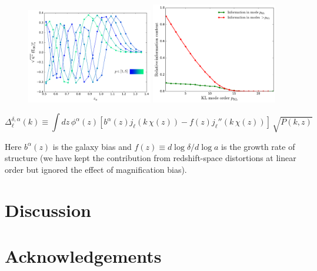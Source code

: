 \documentclass[twocolumn,amsfont,amssymb,amsmath, showpacs,balancelastpage, nofootinbib]{revtex4-1}
\begin{document}
    \begin{figure}
      \centering
      \includegraphics[width=0.49\textwidth]{Figs/kl_modes_gc}
      \includegraphics[width=0.49\textwidth]{Figs/information_gc}
      \caption{}\label{fig:kl_gc}
    \end{figure}
    
    \begin{widetext}
    \begin{equation}
      \Delta^{\delta,\alpha}_\ell(k)\equiv\int dz\,\phi^\alpha(z)\left[b^\alpha(z)j_\ell(k\,\chi(z))-f(z)j_\ell''(k\,\chi(z))\right]\,\sqrt{P(k,z)}
    \end{equation}
    \end{widetext}
    Here $b^\alpha(z)$ is the galaxy bias and $f(z)\equiv d\log\delta/d\log a$ is the growth rate of structure (we have kept the contribution from redshift-space distortions at linear order but ignored the effect of magnification bias).

\section{Discussion}\label{sec:discussion}
  \lipsum[2]

\section*{Acknowledgements}
  \lipsum[3]
  


\appendix
\end{document}
